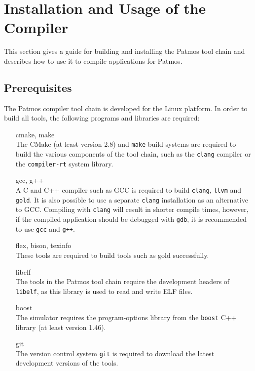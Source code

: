 
\chapter{Installation and Usage of the Compiler}
\label{sec:using_the_compiler}

This section gives a guide for building and installing the Patmos
tool chain and describes how to use it to compile applications for Patmos. 

\section{Prerequisites}

The Patmos compiler tool chain is developed for the Linux platform. 
In order to build all tools, the following programs and libraries are required:

\begin{itemize}
\item[cmake, make] \hfill\\
The CMake (at least version 2.8) and \texttt{make} build systems are required to build the
various components of the tool chain, such as the \texttt{clang} compiler or the \texttt{compiler-rt} system library.
\medskip

\item[gcc, g++] \hfill\\
A C and C++ compiler such as GCC is required to build \texttt{clang}, \texttt{llvm}
and \texttt{gold}. It is also possible to use a separate \texttt{clang} installation as 
an alternative to GCC. Compiling with \texttt{clang} will result in shorter compile
times, however, if the compiled application should be debugged with \texttt{gdb}, it is
recommended to use \texttt{gcc} and \texttt{g++}.
\medskip

\item[flex, bison, texinfo] \hfill\\
These tools are required to build tools such as gold successfully.
\medskip

\item[libelf] \hfill\\
The tools in the Patmos tool chain require the development headers of \texttt{libelf},
as this library is used to read and write ELF files.
\medskip

\item[boost] \hfill\\
The simulator requires the program-options library from the \texttt{boost} C++ library
(at least version 1.46).
\medskip

\item[git] \hfill\\
The version control system \texttt{git} is required 
to download the latest development versions of the tools. 
\end{itemize}


